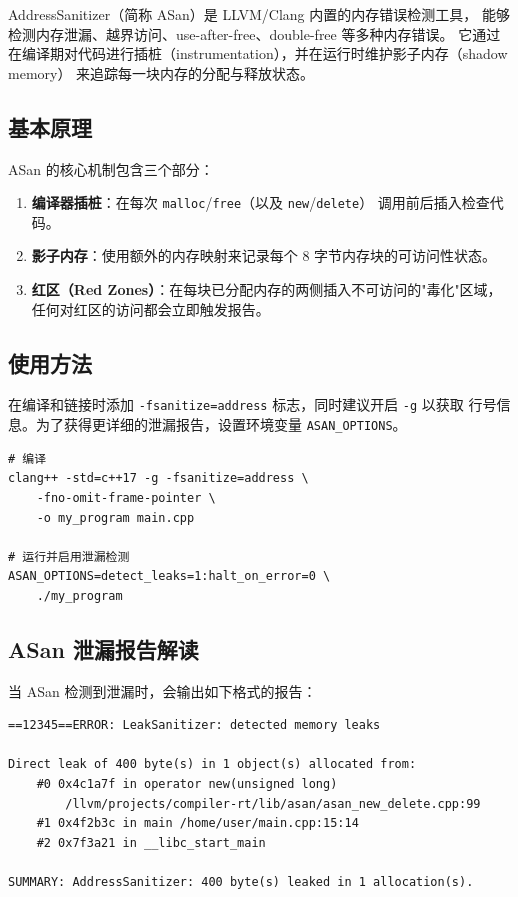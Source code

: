 \documentclass[12pt,a4paper,fontset=fandol]{ctexbook}
\begin{document}
AddressSanitizer（简称 ASan）是 LLVM/Clang 内置的内存错误检测工具，
能够检测内存泄漏、越界访问、use-after-free、double-free 等多种内存错误。
它通过在编译期对代码进行插桩（instrumentation），并在运行时维护影子内存（shadow memory）
来追踪每一块内存的分配与释放状态。

\subsection{基本原理}

ASan 的核心机制包含三个部分：

\begin{enumerate}[nosep]
  \item \textbf{编译器插桩}：在每次 \texttt{malloc}/\allowbreak{}\texttt{free}（以及 \texttt{new}/\allowbreak{}\texttt{delete}）
    调用前后插入检查代码。
  \item \textbf{影子内存}：使用额外的内存映射来记录每个 8 字节内存块的可访问性状态。
  \item \textbf{红区（Red Zones）}：在每块已分配内存的两侧插入不可访问的"毒化"区域，
    任何对红区的访问都会立即触发报告。
\end{enumerate}

\subsection{使用方法}

在编译和链接时添加 \texttt{-fsanitize=address} 标志，同时建议开启 \texttt{-g} 以获取
行号信息。为了获得更详细的泄漏报告，设置环境变量 \texttt{ASAN\_OPTIONS}。

\begin{lstlisting}[style=bashstyle, caption={使用 Clang ASan 编译和运行}]
# 编译
clang++ -std=c++17 -g -fsanitize=address \
    -fno-omit-frame-pointer \
    -o my_program main.cpp

# 运行并启用泄漏检测
ASAN_OPTIONS=detect_leaks=1:halt_on_error=0 \
    ./my_program
\end{lstlisting}

\subsection{ASan 泄漏报告解读}

当 ASan 检测到泄漏时，会输出如下格式的报告：

\begin{lstlisting}[style=bashstyle, caption={ASan 泄漏报告示例}]
==12345==ERROR: LeakSanitizer: detected memory leaks

Direct leak of 400 byte(s) in 1 object(s) allocated from:
    #0 0x4c1a7f in operator new(unsigned long)
        /llvm/projects/compiler-rt/lib/asan/asan_new_delete.cpp:99
    #1 0x4f2b3c in main /home/user/main.cpp:15:14
    #2 0x7f3a21 in __libc_start_main

SUMMARY: AddressSanitizer: 400 byte(s) leaked in 1 allocation(s).
\end{lstlisting}
\end{document}
